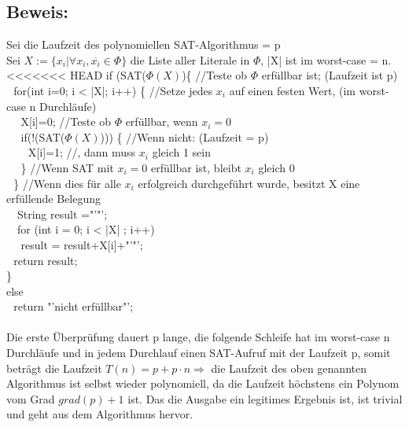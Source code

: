 \documentclass[a4paper,11pt,twoside]{article}
\newcommand{\green}[1]{\textcolor{comment_green}{#1}}
\begin{document}
\subsection*{Beweis:}
Sei die Laufzeit des polynomiellen SAT-Algorithmus = p\\
Sei $X:=\{x_i| \forall x_i,\overline{x_i} \in \Phi\}$ die Liste aller Literale in $\Phi$, |X| ist im worst-case = n.\\
<<<<<<< HEAD
if (SAT($\Phi(X)$)\{   \green{//Teste ob $\Phi$ erfüllbar ist; (Laufzeit ist p)} \\
$~~~$for(int i=0; i < |X|; i++) \{   \green{//Setze jedes $x_i$ auf einen festen Wert, (im worst-case n Durchläufe)}\\
$~~~$$~~~$X[i]=0;   \green{//Teste ob $\Phi$ erfüllbar, wenn $x_i=0$}\\
$~~~$$~~~$if(!(SAT($\Phi(X)$))) \{  \green{//Wenn nicht: (Laufzeit = p)}\\
$~~~$$~~~$$~~~$X[i]=1; 	 \green{//, dann muss $x_i$ gleich 1 sein}\\
$~~~$$~~~$\}  \green{//Wenn SAT mit $x_i=0$ erfüllbar ist, bleibt $x_i$ gleich 0} \\
$~~~$\}  \green{//Wenn dies für alle $x_i$ erfolgreich durchgeführt wurde, besitzt X eine erfüllende Belegung}\\
$~~~$ String result ="'"';\\
$~~~$ for (int i = 0; i < |X| ; i++)\\
$~~~$$~~~$result = result+X[i]+"'"';\\
$~~~$return result;\\
\}\\
else\\
$~~~$return "'nicht erfüllbar"';\\
\\
Die erste Überprüfung dauert p lange, die folgende Schleife hat im worst-case n Durchläufe und in jedem Durchlauf einen SAT-Aufruf mit der Laufzeit p, somit beträgt die Laufzeit $T(n)=p+p\cdot n \Rightarrow$ die Laufzeit des oben genannten Algorithmus ist selbst wieder polynomiell, da die Laufzeit höchstens ein Polynom vom Grad $grad(p)+1$ ist. Das die Ausgabe ein legitimes Ergebnis ist, ist trivial und geht aus dem Algorithmus hervor.
\end{document}
